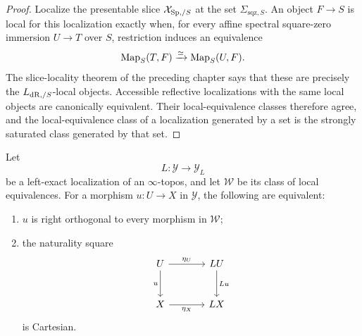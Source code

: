 \begin{proof}
Localize the presentable slice \(\mathcal X_{\mathrm{Sp},/S}\) at the set
\(\Sigma_{\mathrm{sqz},S}\).  An object \(F\to S\) is local for this localization exactly when,
for every affine spectral square-zero immersion \(U\to T\) over \(S\), restriction induces an
equivalence
\[
    \operatorname{Map}_S(T,F)\xrightarrow{\simeq}\operatorname{Map}_S(U,F).
\]
The slice-locality theorem of the preceding chapter says that these are precisely the
\(L_{\mathrm{dR},/S}\)-local objects.  Accessible reflective localizations with the same local objects are
canonically equivalent.  Their local-equivalence classes therefore agree, and the local-equivalence
class of a localization generated by a set is the strongly saturated class generated by that set.
\end{proof}

\begin{lemma}
\label{lem:left-exact-local-map-criterion}
Let
\[
    L:\mathcal Y\longrightarrow\mathcal Y_L
\]
be a left-exact localization of an \(\infty\)-topos, and let \(\mathcal W\) be its class of local
equivalences.  For a morphism \(u:U\to X\) in \(\mathcal Y\), the following are equivalent:
\begin{enumerate}
\item \(u\) is right orthogonal to every morphism in \(\mathcal W\);
\item the naturality square
\[
\begin{tikzcd}[column sep=large,row sep=large]
    U \ar[r,"\eta_U"] \ar[d,"u"']
        & LU \ar[d,"Lu"]\\
    X \ar[r,"\eta_X"']
        & LX
\end{tikzcd}
\]
is Cartesian.
\end{enumerate}
\end{lemma}


